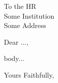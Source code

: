\documentclass{letter}
\begin{document}
\begin{letter}{To the HR \\ Some Institution\\ Some Address}

\opening{Dear ...,}

body...

\closing{Yours Faithfully,}

\end{letter}
\end{document}
